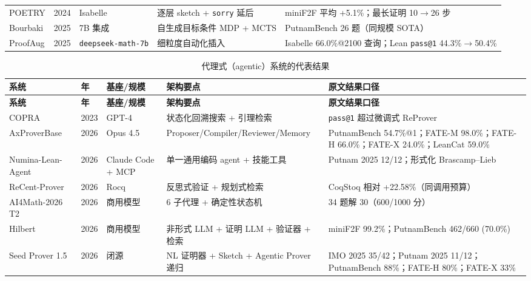 \documentclass[UTF8,a4paper,11pt,fontset=windows]{ctexart}
\newcommand{\code}[1]{\texttt{#1}}
\newcommand{\brk}{\penalty0\relax}
\begin{document}
{\begin{longtable}{@{}L{2.6cm}L{0.8cm}L{2.4cm}L{4.1cm}L{5.3cm}@{}}
POETRY & 2024 & Isabelle & 逐层 sketch + \code{sorry} 延后 & miniF2F 平均 +5.1\%；\brk{}最长证明 10$\rightarrow$26 步 \cite{poetry} \\
Bourbaki & 2025 & 7B 集成 & 自生成目标条件 MDP + MCTS & PutnamBench 26 题（同规模 SOTA）\cite{bourbaki} \\
ProofAug & 2025 & \code{deepseek-\allowbreak math-\allowbreak 7b} & 细粒度自动化插入 & Isabelle 66.0\%@2100 查询；\newline Lean \code{pass@1} 44.3\%$\rightarrow$50.4\% \cite{proofaug} \\
\end{longtable}
}

\vspace{6pt}

{\small
\begin{longtable}{@{}L{2.6cm}L{0.9cm}L{2.4cm}L{4.0cm}L{5.3cm}@{}}
\caption{代理式（agentic）系统的代表结果}\label{tab:agentic}\\
\toprule
\textbf{系统} & \textbf{年} & \textbf{基座/规模} & \textbf{架构要点} & \textbf{原文结果口径} \\
\midrule
\endfirsthead
\toprule
\textbf{系统} & \textbf{年} & \textbf{基座/规模} & \textbf{架构要点} & \textbf{原文结果口径} \\
\midrule
\endhead
\bottomrule
\endfoot
COPRA & 2023 & GPT-4 & 状态化回溯搜索 + 引理检索 & \code{pass@1} 超过微调式 ReProver \cite{copra} \\
AxProverBase & 2026 & Opus 4.5 & Proposer/\allowbreak Compiler/\allowbreak Reviewer/\allowbreak Memory & PutnamBench 54.7\%@1；\newline FATE-M 98.0\%；\newline FATE-H 66.0\%；\newline FATE-X 24.0\%；\newline LeanCat 59.0\% \cite{axprover} \\
Numina-Lean-Agent & 2026 & Claude Code + MCP & 单一通用编码 agent + 技能工具 & Putnam 2025 12/12；形式化 Brascamp--Lieb \cite{numina} \\
ReCent-Prover & 2026 & Rocq & 反思式验证 + 规划式检索 & CoqStoq 相对 +22.58\%（同调用预算）\cite{recent} \\
AI4Math-2026 T2 & 2026 & 商用模型 & 6 子代理 + 确定性状态机 & 34 题解 30（600/1000 分）\cite{ai4math} \\
Hilbert & 2026 & 商用模型 & 非形式 LLM + 证明 LLM + 验证器 + 检索 & miniF2F 99.2\%；\brk{}PutnamBench 462/660 (70.0\%) \cite{hilbert} \\
Seed Prover 1.5 & 2026 & 闭源 & NL 证明器 + Sketch + Agentic Prover 递归 & IMO 2025 35/42；\brk{}Putnam 2025 11/12；\brk{}PutnamBench 88\%；\brk{}FATE-H 80\%；\brk{}FATE-X 33\% \cite{seedprover} \\

\end{longtable}}
\end{document}

